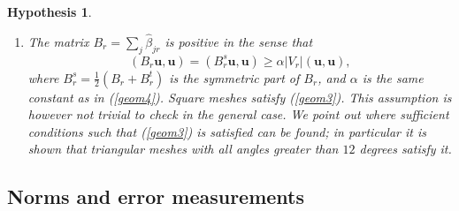 \documentclass[a4paper,french,english,10pt]{article}
\newcommand\uu{\mathbf{u}}
\newcommand\bej{\widehat{\beta}_{jr}}
\newtheorem{hyp}[theorem]{Hypothesis}
\begin{document}
\begin{hyp}
\begin{enumerate}
\item  The matrix $B_r=\sum_j\bej$ is positive in the sense that 
\begin{equation}\label{geom3}
(B_r \uu, \uu)=(B^s_r \uu, \uu)\geq \alpha \vert
V_r\vert (\uu,\uu),
\end{equation}
where $B^s_r=\frac12 (B_r+B_r^t)$ is the symmetric part of $B_r$, and $\alpha$ is the same constant as in (\ref{geom4}).
Square meshes satisfy (\ref{geom3}).
This assumption is however not trivial to check in the general case.
We point out  \cite{glaceap} where
 sufficient conditions such that (\ref{geom3}) is satisfied
can be found; in particular it is shown 
that  triangular meshes with all angles greater than $12$ degrees
satisfy it. 
\end{enumerate}
\end{hyp}

\subsection{Norms and error measurements}
\end{document}
